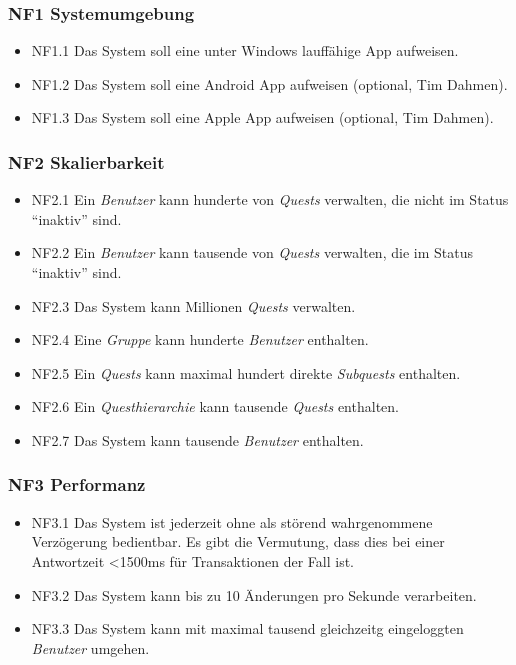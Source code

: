 \documentclass{article}
\begin{document}
\subsubsection{NF1 Systemumgebung}

\begin{itemize}
	\item{NF1.1} Das System soll eine unter Windows lauffähige App aufweisen. 
	\item{NF1.2} Das System soll eine Android App aufweisen (optional, Tim Dahmen). 
	\item{NF1.3} Das System soll eine Apple App aufweisen (optional, Tim Dahmen). 
\end{itemize}

\subsubsection{NF2 Skalierbarkeit}

\begin{itemize}
	\item{NF2.1} Ein \textit{Benutzer} kann hunderte von \textit{Quests} verwalten, die nicht im Status ``inaktiv'' sind.
	\item{NF2.2} Ein \textit{Benutzer} kann tausende von \textit{Quests} verwalten, die im Status ``inaktiv'' sind.
	\item{NF2.3} Das System kann Millionen \textit{Quests} verwalten.
	\item{NF2.4} Eine \textit{Gruppe} kann hunderte \textit{Benutzer} enthalten.
	\item{NF2.5} Ein \textit{Quests} kann maximal hundert direkte \textit{Subquests} enthalten.
	\item{NF2.6} Ein \textit{Questhierarchie} kann tausende \textit{Quests} enthalten.
	\item{NF2.7} Das System kann tausende \textit{Benutzer} enthalten.
\end{itemize}

\subsubsection{NF3 Performanz}

\begin{itemize}
	\item{NF3.1} Das System ist jederzeit ohne als störend wahrgenommene Verzögerung bedientbar. Es gibt die Vermutung, dass dies bei einer Antwortzeit <1500ms für Transaktionen der Fall ist. 
	\item{NF3.2} Das System kann bis zu 10 Änderungen pro Sekunde verarbeiten. 
	\item{NF3.3} Das System kann mit maximal tausend gleichzeitg eingeloggten  \textit{Benutzer} umgehen. 
\end{itemize}
\end{document}
